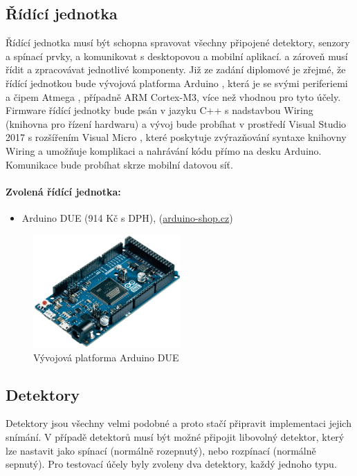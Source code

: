 \documentclass[FM,DP]{tulthesis}  %
\begin{document}
\subsection{Řídící jednotka}
Řídící jednotka musí být schopna spravovat všechny připojené detektory, senzory a spínací prvky, a komunikovat s desktopovou a mobilní aplikací. a zároveň musí řídit a zpracovávat jednotlivé komponenty. Již ze zadání diplomové je zřejmé, že řídící jednotkou bude vývojová platforma Arduino \cite{Pruvodce arduinem}, která je se svými periferiemi \cite{Arduino schematic} a čipem Atmega \cite{Atmega datasheet}, případně ARM Cortex-M3, více než vhodnou pro tyto účely. Firmware řídící jednotky bude psán v jazyku  C++ s nadstavbou Wiring (knihovna pro řízení hardwaru) \cite{Wiring} a vývoj bude probíhat v prostředí Visual Studio 2017 s rozšířením Visual Micro \cite{Visual Micro}, které poskytuje zvýrazňování syntaxe knihovny Wiring a umožňuje komplikaci a nahrávání kódu přímo na desku Arduino. Komunikace bude probíhat skrze mobilní datovou síť.

\paragraph{Zvolená řídící jednotka:}
\begin{itemize}
\item Arduino DUE (914 Kč s DPH), (\url{arduino-shop.cz})
\end{itemize}

\begin{figure}[H]
\begin{center}
\includegraphics[width=0.5\textwidth]{images/arduinoDue.png}
\caption{Vývojová platforma Arduino DUE}
\label{image}
\end{center}
\end{figure}

\subsection{Detektory}
Detektory jsou všechny velmi podobné a proto stačí připravit implementaci jejich snímání. V případě detektorů musí být možné připojit libovolný detektor, který lze nastavit jako spínací (normálně rozepnutý), nebo rozpínací (normálně sepnutý). Pro testovací účely byly zvoleny dva detektory, každý jednoho typu.
\end{document}
